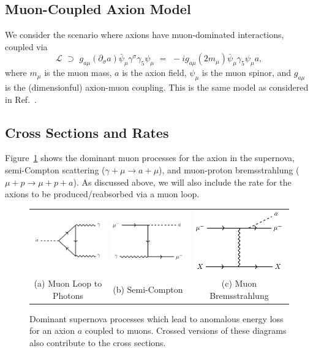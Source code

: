 \documentclass[11pt]{article}
\begin{document}
\subsection{Muon-Coupled Axion Model}

We consider the scenario where axions have muon-dominated interactions, coupled via
\begin{equation}
    \mathcal{L} \,\, \supset \,\,  g_{a\mu}(\partial_{\sigma} a)\bar{\psi}_{\mu}\gamma^{\sigma}\gamma_5\psi_{\mu} \,\, = \,\, -i g_{a\mu}(2m_{\mu})\bar{\psi}_{\mu}\gamma_5\psi_{\mu}a,
    \label{eq:lagax}
\end{equation}
where $m_{\mu}$ is the muon mass, $a$ is the axion field, $\psi_{\mu}$ is the muon spinor, and $g_{a\mu}$ is the (dimensionful) axion-muon coupling. This is the same model as considered in Ref.~\cite{Bollig:2020xdr}.


\subsection{Cross Sections and Rates}\label{sec:axionrates}

Figure~\ref{fig:axfigs} shows the dominant muon processes for the axion in the supernova, semi-Compton scattering ($\gamma + \mu \rightarrow a + \mu$), and muon-proton bremsstrahlung ($\mu + p \rightarrow \mu + p + a$). As discussed above, we will also include the rate for the axions to be produced/reabsorbed via a muon loop.

\begin{figure}
\begin{tabular}{ccc}
  \includegraphics[width=0.3\columnwidth]{axloop} &  
    \includegraphics[width=0.3\columnwidth]{axsemicomp} &
    \includegraphics[width=0.3\columnwidth]{axbrem} \\
(a) Muon Loop to Photons & (b) Semi-Compton & (c) Muon Bremsstrahlung \\[6pt]
\end{tabular}
\caption{Dominant supernova processes which lead to anomalous energy loss for an axion $a$ coupled to muons. Crossed versions of these diagrams also contribute to the cross sections.}
\label{fig:axfigs}
\end{figure}
\end{document}

